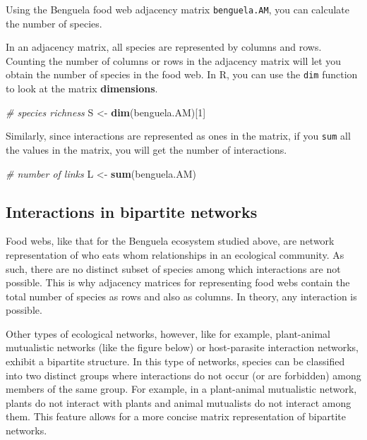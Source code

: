 \documentclass[
]{article}
\newenvironment{Shaded}{\begin{snugshade}}{\end{snugshade}}
\newcommand{\CommentTok}[1]{\textcolor[rgb]{0.56,0.35,0.01}{\textit{#1}}}
\newcommand{\DecValTok}[1]{\textcolor[rgb]{0.00,0.00,0.81}{#1}}
\newcommand{\FunctionTok}[1]{\textcolor[rgb]{0.13,0.29,0.53}{\textbf{#1}}}
\newcommand{\NormalTok}[1]{#1}
\newcommand{\OtherTok}[1]{\textcolor[rgb]{0.56,0.35,0.01}{#1}}
\begin{document}
Using the Benguela food web adjacency matrix \texttt{benguela.AM}, you
can calculate the number of species.

In an adjacency matrix, all species are represented by columns and rows.
Counting the number of columns or rows in the adjacency matrix will let
you obtain the number of species in the food web. In R, you can use the
\texttt{dim} function to look at the matrix \textbf{dimensions}.

\begin{Shaded}
\begin{Highlighting}[]
\CommentTok{\# species richness}
\NormalTok{S }\OtherTok{\textless{}{-}} \FunctionTok{dim}\NormalTok{(benguela.AM)[}\DecValTok{1}\NormalTok{]}
\end{Highlighting}
\end{Shaded}

Similarly, since interactions are represented as ones in the matrix, if
you \texttt{sum} all the values in the matrix, you will get the number
of interactions.

\begin{Shaded}
\begin{Highlighting}[]
\CommentTok{\# number of links}
\NormalTok{L }\OtherTok{\textless{}{-}} \FunctionTok{sum}\NormalTok{(benguela.AM)}
\end{Highlighting}
\end{Shaded}

\subsection{Interactions in bipartite
networks}\label{interactions-in-bipartite-networks}

Food webs, like that for the Benguela ecosystem studied above, are
network representation of who eats whom relationships in an ecological
community. As such, there are no distinct subset of species among which
interactions are not possible. This is why adjacency matrices for
representing food webs contain the total number of species as rows and
also as columns. In theory, any interaction is possible.

Other types of ecological networks, however, like for example,
plant-animal mutualistic networks (like the figure below) or
host-parasite interaction networks, exhibit a bipartite structure. In
this type of networks, species can be classified into two distinct
groups where interactions do not occur (or are forbidden) among members
of the same group. For example, in a plant-animal mutualistic network,
plants do not interact with plants and animal mutualists do not interact
among them. This feature allows for a more concise matrix representation
of bipartite networks.
\end{document}
